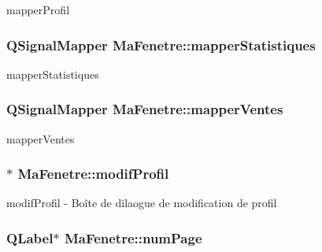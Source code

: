 mapper\-Profil 

\hypertarget{class_ma_fenetre_ad5133adcd9cb734a07b9534996224d15}{
\subsubsection[{mapper\-Statistiques}]{\setlength{\rightskip}{0pt plus 5cm}Q\-Signal\-Mapper Ma\-Fenetre\-::mapper\-Statistiques\hspace{0.3cm}{\ttfamily [protected]}}}\label{class_ma_fenetre_ad5133adcd9cb734a07b9534996224d15}


mapper\-Statistiques 

\hypertarget{class_ma_fenetre_a68f5911be4ba075ef635413eee34b623}{
\subsubsection[{mapper\-Ventes}]{\setlength{\rightskip}{0pt plus 5cm}Q\-Signal\-Mapper Ma\-Fenetre\-::mapper\-Ventes\hspace{0.3cm}{\ttfamily [protected]}}}\label{class_ma_fenetre_a68f5911be4ba075ef635413eee34b623}


mapper\-Ventes 

\hypertarget{class_ma_fenetre_accfaae414323cd476f255f51a98414f0}{
\subsubsection[{modif\-Profil}]{$\ast$ Ma\-Fenetre\-::modif\-Profil\hspace{0.3cm}{\ttfamily [protected]}}}\label{class_ma_fenetre_accfaae414323cd476f255f51a98414f0}


modif\-Profil -\/ Boîte de dilaogue de modification de profil 

\hypertarget{class_ma_fenetre_a941eff753d1e20d0ef212aa875570330}{
\subsubsection[{num\-Page}]{\setlength{\rightskip}{0pt plus 5cm}Q\-Label$\ast$ Ma\-Fenetre\-::num\-Page\hspace{0.3cm}{\ttfamily [protected]}}}\label{class_ma_fenetre_a941eff753d1e20d0ef212aa875570330}


